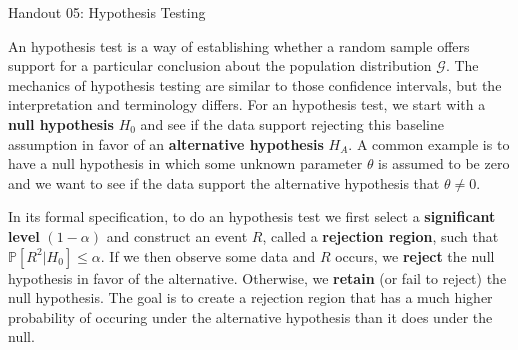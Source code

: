 \documentclass{tufte-handout}
\newcommand{\Prob}{\mathbb{P}}
\begin{document}
\justify

{\LARGE Handout 05: Hypothesis Testing}

\vspace*{18pt}

\noindent
An hypothesis test is a way of establishing whether a random sample
offers support for a particular conclusion about the population 
distribution $\mathcal{G}$. The mechanics of hypothesis testing are
similar to those confidence intervals, but the interpretation and
terminology differs. For an hypothesis test, we start with a
\textbf{null hypothesis} $H_0$ and see if the data support rejecting
this baseline assumption in favor of an \textbf{alternative hypothesis}
$H_A$. A common example is to have a null hypothesis in which some unknown
parameter $\theta$ is assumed to be zero and we want to see if the data 
support the alternative hypothesis that $\theta \neq 0$.

In its formal specification, to do an hypothesis test we first select
a \textbf{significant level} $(1-\alpha)$ and construct an event $R$,
called a \textbf{rejection region}, such that $\Prob[R^2 | H_0] \leq \alpha$.
If we then observe some data and $R$ occurs, we \textbf{reject} the
null hypothesis in favor of the alternative. Otherwise, we \textbf{retain}
(or fail to reject) the null hypothesis. The goal is to create a rejection
region that has a much higher probability of occuring under the alternative
hypothesis than it does under the null.
\end{document}
